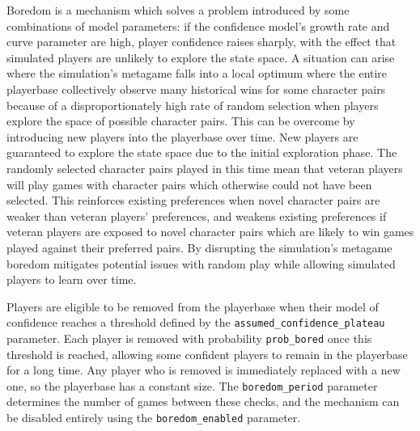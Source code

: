 Boredom is a mechanism which solves a problem introduced by some combinations of
model parameters: if the confidence model's growth rate and curve parameter are
high, player confidence raises sharply, with the effect that simulated players
are unlikely to explore the state space. A situation can arise where the
simulation's metagame falls into a local optimum where the entire playerbase
collectively observe many historical wins for some character pairs because of a
disproportionately high rate of random selection when players explore the space
of possible character pairs. This can be overcome by introducing new players
into the playerbase over time. New players are guaranteed to explore the state
space due to the initial exploration phase. The randomly selected character
pairs played in this time mean that veteran players will play games with
character pairs which otherwise could not have been selected. This reinforces
existing preferences when novel character pairs are weaker than veteran players'
preferences, and weakens existing preferences if veteran players are exposed to
novel character pairs which are likely to win games played against their
preferred pairs. By disrupting the simulation's metagame boredom mitigates
potential issues with random play while allowing simulated players to learn over
time.

Players are eligible to be removed from the playerbase when their model of
confidence reaches a threshold defined by the
\lstinline{assumed_confidence_plateau} parameter. Each player is removed with
probability \lstinline{prob_bored} once this threshold is reached, allowing some
confident players to remain in the playerbase for a long time. Any player who is
removed is immediately replaced with a new one, so the playerbase has a constant
size. The \lstinline{boredom_period} parameter determines the number of games
between these checks, and the mechanism can be disabled entirely using the
\lstinline{boredom_enabled} parameter.







